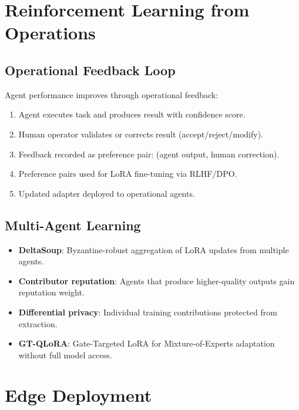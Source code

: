 \documentclass[11pt,letterpaper]{article}
\begin{document}
\section{Reinforcement Learning from Operations}

\subsection{Operational Feedback Loop}

Agent performance improves through operational feedback:

\begin{enumerate}
\item Agent executes task and produces result with confidence score.
\item Human operator validates or corrects result (accept/reject/modify).
\item Feedback recorded as preference pair: (agent output, human correction).
\item Preference pairs used for LoRA fine-tuning via RLHF/DPO.
\item Updated adapter deployed to operational agents.
\end{enumerate}

\subsection{Multi-Agent Learning}

\begin{itemize}
\item \textbf{DeltaSoup}: Byzantine-robust aggregation of LoRA updates from multiple agents.
\item \textbf{Contributor reputation}: Agents that produce higher-quality outputs gain reputation weight.
\item \textbf{Differential privacy}: Individual training contributions protected from extraction.
\item \textbf{GT-QLoRA}: Gate-Targeted LoRA for Mixture-of-Experts adaptation without full model access.
\end{itemize}

\section{Edge Deployment}
\end{document}
